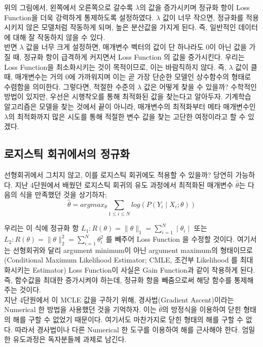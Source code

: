 \documentclass[a4paper]{oblivoir}
\begin{document}
\indent 위의 그림에서, 왼쪽에서 오른쪽으로 갈수록 $\lambda$의 값을 증가시키며 정규화 항이 Loss Function을 더욱 강력하게 통제하도록 설정하였다. $\lambda$ 값이 너무 작으면, 정규화를 적용시키지 않은 모델처럼 작동하게 되며, 높은 분산값을 가지게 된다. 즉, 일반적인 데이터에 대해 잘 작동하지 않을 수 있다. \\
\indent 반면 $\lambda$ 값을 너무 크게 설정하면, 매개변수 벡터의 값이 단 하나라도 0이 아닌 값을 가질 때, 정규화 항이 급격하게 커지면서 Loss Function 의 값을 증가시킨다. 우리는 Loss Function을 최소화시키는 것이 목적이므로, 이는 바람직하지 않다. 즉, $\lambda$ 값이 클 때, 매개변수는 거의 0에 가까워지며 이는 곧 가장 단순한 모델인 상수함수의 형태로 수렴함을 의미한다. 그렇다면, 적절한 수준의 $\lambda$ 값은 어떻게 찾을 수 있을까? 수학적인 방법이 있지만, 우선은 시행착오를 통해 최적화된 값을 찾는다고 알아두자. 기계학습 알고리즘은 모델을 찾는 것에서 끝이 아니라, 매개변수의 최적화부터 메타 매개변수인 $\lambda$의 최적화까지 많은 시도를 통해 적절한 변수 값을 찾는 고단한 여정이라고 할 수 있겠다.

\subsection{로지스틱 회귀에서의 정규화}
선형회귀에서 그치지 않고, 이를 로지스틱 회귀에도 적용할 수 있을까? 당연히 가능하다. 지난 4단원에서 배웠던 로지스틱 회귀의 유도 과정에서 최적화된 매개변수 $\hat{\theta}$는 다음의 식을 만족했던 것을 상기하자;
\begin{equation}
\hat{\theta} = argmax_{\theta}\sum_{1 \leq i \leq N}log(P(Y_{i} \mid X_{i}; \theta)) \tag{6-24}
\end{equation}

\indent 우리는 이 식에 정규화 항 $L_{1}: R(\theta) = \| \theta \|_{1} = \sum_{i=1}^{N}\mid \theta_{i} \mid$ 또는 \\ $L_{2}: R(\theta) = \| \theta \|_{2}^{2} = \sum_{i=1}^{N}\theta_{i}^{2}$ 를 빼주어 Loss Function 을 수정할 것이다. 여기서는 선형회귀와 달리 argument minimum이 아닌 argument maximum의 형태이므로 (Conditional Maximum Likelihood Estimator; CMLE, 조건부 Likelihood 를 최대화시키는 Estimator) Loss Function이 사실은 Gain Function과 같이 작용하게 된다. 즉, 함수값을 최대한 증가시켜야 하는데, 정규화 항을 빼줌으로써 해당 함수를 통제해주는 것이다. \\
\indent 지난 4단원에서 이 MCLE 값을 구하기 위해, 경사법(Gradient Ascent)이라는 Numerical 한 방법을 사용했던 것을 기억하자. 이는 $\hat{\theta}$의 방정식을 이용하여 닫힌 형태의 해를 구할 수 없었기 때문이다. 여기서도 마찬가지로 닫힌 형태의 해를 구할 수 없다. 따라서 경사법이나 다른 Numerical 한 도구를 이용하여 해를 근사해야 한다. 엄밀한 유도과정은 독자분들께 과제로 남긴다.
\end{document}
